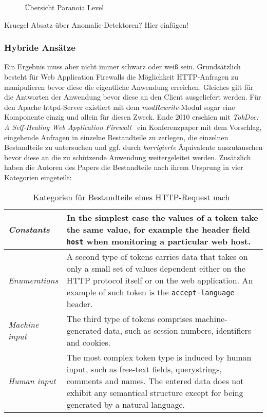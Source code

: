\begin{figure}[ht]
  \centering
  
  \caption{Übersicht Paranoia Level~\cite{owaspcrs}}
  \label{fig.paranoia}
\end{figure}



\begin{neu}
  Kruegel Absatz über Anomalie-Detektoren? Hier einfügen!
\end{neu}

\subsubsection{Hybride Ansätze} %
Ein Ergebnis muss aber nicht immer schwarz oder weiß sein.  Grundsätzlich besteht für Web Application Firewalls die Möglichkeit HTTP-Anfragen zu manipulieren bevor diese die eigentliche Anwendung erreichen. Gleiches gilt für die Antworten der Anwendung bevor diese an den Client ausgeliefert werden. Für den Apache httpd-Server existiert mit dem \emph{modRewrite}-Modul sogar eine Komponente einzig und allein für diesen Zweck. Ende 2010 erschien mit \glqq\emph{TokDoc: A Self-Healing Web Application Firewall}\grqq~\cite{Krueger2010} ein Konferenzpaper mit dem Vorschlag, eingehende Anfragen in einzelne Bestandteile zu zerlegen, die einzelnen Bestandteile zu untersuchen und ggf. durch \emph{korrigierte} Äquivalente auszutauschen bevor diese an die zu schützende Anwendung weitergeleitet werden. Zusätzlich haben die Autoren des Papers die Bestandteile nach ihrem Ursprung in vier Kategorien eingeteilt:\\

\begin{table}[h]
  \centering
  \begin{tabular}{|l|p{8cm}|}
    \hline
    \emph{Constants} & In the simplest case the values of a token take the same value, for example the header field \verb=host= when monitoring a particular web host. \\
    \hline
    \emph{Enumerations} &  A second type of tokens carries data that takes on only a small set of values dependent either on the HTTP protocol itself or on the web application. An example of such token is the \verb=accept-language= header.\\
    \hline
    \emph{Machine input} & The third type of tokens comprises machine-generated data, such as session numbers, identifiers and cookies. \\
    \hline
    \emph{Human input} & The most complex token type is induced by human input, such as free-text fields, querystrings, comments and names. The entered data does not exhibit any semantical structure except for being generated by a natural language.  \\
    \hline
  \end{tabular}
  \caption{Kategorien für Bestandteile eines HTTP-Request nach~\cite{Krueger2010}}
  \label{tab:tocdoc}
\end{table}

